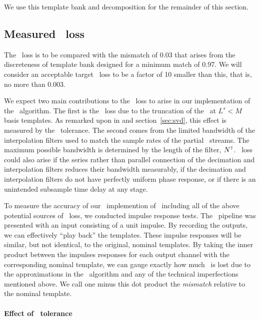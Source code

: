 We use this template bank and decomposition for the remainder of this section.

\subsection{Measured \SNR\ loss}

The \SNR\ loss is to be compared with the mismatch of 0.03 that arises from the
discreteness of template bank designed for a minimum match of 0.97.  We will consider
an acceptable target \SNR\ loss to be a factor of 10 smaller than this, that is, no more
than 0.003.

We expect two main contributions to the \SNR\ loss to arise in our
implementation of the \lloid\ algorithm.  The first is the \SNR\ loss due to
the truncation of the \SVD\ at $L^s < M$ basis templates.  As remarked upon in
\citet{Cannon:2010p10398} and section~\ref{sec:svd}, this effect is measured by
the \SVD\ tolerance.  The second comes from the limited bandwidth of the
interpolation filters used to match the sample rates of the partial \SNR\ streams.
The maximum possible bandwidth is determined by the length of the filter,
$N^\shortuparrow$.  \SNR\ loss could also arise if the series rather than parallel
connection of the decimation and interpolation filters reduces their bandwidth
measurably, if the decimation and interpolation filters do not have perfectly uniform
phase response, or if there is an unintended subsample time delay at any stage.

To measure the accuracy of our \gstreamer\ implemention of \lloid\ including all of
the above potential sources of \SNR\ loss, we conducted impulse response tests.  The
\gstreamer\ pipeline was presented with an input consisting of a unit impulse.  By
recording the outputs, we can effectively ``play back'' the templates.  These impulse
responses will be similar, but not identical, to the original, nominal templates.  By
taking the inner product between the impulses responses for each output 
channel with the corresponding nominal template, we can gauge exactly how much \SNR\
is lost due to the approximations in the \lloid\ algorithm and any of the technical
imperfections mentioned above.  We call one minus this dot product the \emph{mismatch}
relative to the nominal template.

\paragraph{Effect of \SVD\ tolerance}

